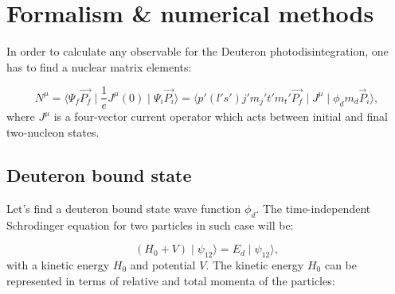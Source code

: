 \chapter{Formalism \& numerical methods}


In order to calculate any observable for the Deuteron photodisintegration,
one has to find a nuclear matrix elements:

\begin{equation}
    N^\mu = \langle \Psi_f \vec{P_f} \mid \frac{1}{e}J^\mu(0) \mid \Psi_i \vec{P_i} \rangle =
    \langle p' (l's')j'm_j't'm_t' \vec{P_f} \mid J^\mu \mid \phi_d m_d \vec{P}_i \rangle, 
    \label{main}
\end{equation}
where $J^\mu$ is a four-vector current operator which acts between initial and final 
two-nucleon states. 



\section{Deuteron bound state}
    \label{sec:deut_bound}

    Let's find a deuteron bound state wave function $\phi_d$. The time-independent Schrodinger
    equation for two particles in such case will be:

    \begin{equation}
        (H_0 + V) \mid \psi_{12} \rangle  = E_d \mid \psi_{12} \rangle,
        \label{shrod_bound}
    \end{equation}
    with a kinetic energy $H_0$ and potential $V$. 
    The kinetic energy $H_0$ can be represented in terms of  relative and total momenta
    of the particles:

